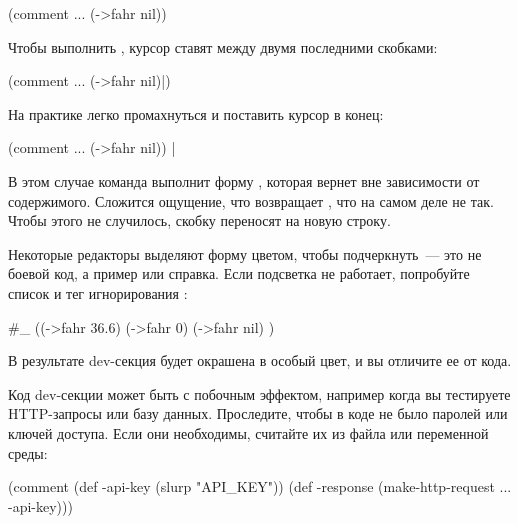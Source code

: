 \begin{english}
  \begin{clojure}
(comment
  ...
  (->fahr nil))
  \end{clojure}
\end{english}

Чтобы выполнить , курсор ставят между двумя последними скобками:

\begin{english}
  \begin{clojure}
(comment
  ...
  (->fahr nil)|)
  \end{clojure}
\end{english}

На практике легко промахнуться и поставить курсор в конец:

\begin{english}
  \begin{clojure}
(comment
  ...
  (->fahr nil)) |
  \end{clojure}
\end{english}

В этом случае команда  выполнит форму , которая вернет  вне зависимости от содержимого. Сложится ощущение, что  возвращает , что на самом деле не так. Чтобы этого не случилось, скобку  переносят на новую строку.

Некоторые редакторы выделяют форму  цветом, чтобы подчеркнуть~--- это не боевой код, а пример или справка. Если подсветка не работает, попробуйте список и тег игнорирования \code{\#\_}:

\begin{english}
  \begin{clojure}
#_
((->fahr 36.6)
  (->fahr 0)
  (->fahr nil)
)
  \end{clojure}
\end{english}

В результате dev-секция будет окрашена в особый цвет, и вы отличите ее от кода.

Код dev-секции может быть с побочным эффектом, например когда вы тестируете HTTP-запросы или базу данных. Проследите, чтобы в коде не было паролей или ключей доступа. Если они необходимы, считайте их из файла или переменной среды:

\begin{english}
  \begin{clojure}
(comment
  (def -api-key
    (slurp "API_KEY"))
  (def -response
    (make-http-request ... -api-key)))
  \end{clojure}
\end{english}


